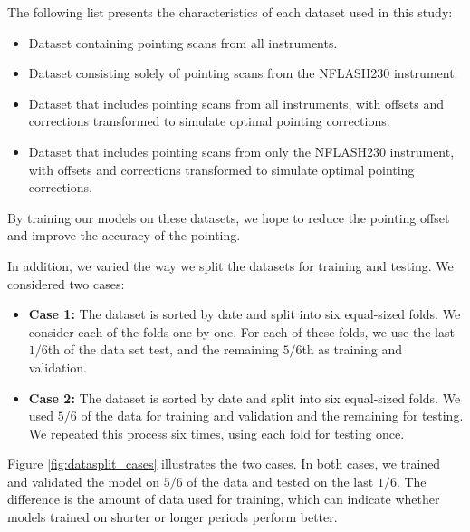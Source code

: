 The following list presents the characteristics of each dataset used in this study:
\begin{itemize}
\item Dataset containing pointing scans from all instruments.
\item Dataset consisting solely of pointing scans from the NFLASH230 instrument.
\item Dataset that includes pointing scans from all instruments, with offsets and corrections transformed to simulate optimal pointing corrections.
\item Dataset that includes pointing scans from only the NFLASH230 instrument, with offsets and corrections transformed to simulate optimal pointing corrections.
\end{itemize}

By training our models on these datasets, we hope to reduce the pointing offset and improve the accuracy of the pointing.

In addition, we varied the way we split the datasets for training and testing.
We considered two cases:

\begin{itemize}
    \item \textbf{Case 1:} The dataset is sorted by date and split into six equal-sized folds.
    We consider each of the folds one by one.
    For each of these folds, we use the last $1/6$th of the data set test, and the remaining $5/6$th as training and validation.
    \item \textbf{Case 2:} The dataset is sorted by date and split into six equal-sized folds.
    We used $5/6$ of the data for training and validation and the remaining for testing.
    We repeated this process six times, using each fold for testing once.
\end{itemize}

Figure \ref{fig:datasplit_cases} illustrates the two cases.
In both cases, we trained and validated the model on $5/6$ of the data and tested on the last $1/6$.
The difference is the amount of data used for training, which can indicate whether models trained on shorter or longer periods perform better.

